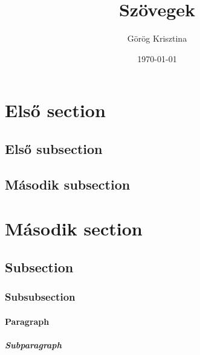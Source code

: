 \documentclass{article}
\title{Szövegek}
\author{Görög Krisztina}
\date{\today}
\begin{document}
\maketitle
\setcounter{tocdepth}{5}
\tableofcontents
\clearpage

\setcounter{secnumdepth}{5}

\section{Első section}
\subsection{Első subsection}
\hulipsum

\subsection{Második subsection}
\hulipsum

\section[Második]{Második section}
\subsection{Subsection}
\subsubsection{Subsubsection}
\paragraph{Paragraph}
\subparagraph{Subparagraph}
\end{document}
